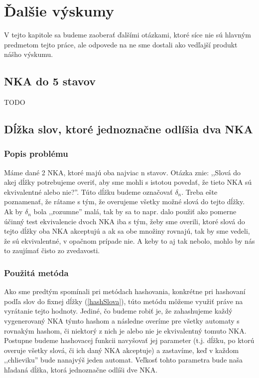 \chapter{Ďalšie výskumy}

V tejto kapitole sa budeme zaoberať ďalšími otázkami, ktoré síce nie sú hlavným predmetom tejto práce, ale odpovede na ne sme dostali ako vedľajší produkt nášho výskumu.

\section{NKA do 5 stavov}

TODO

\section{Dĺžka slov, ktoré jednoznačne odlíšia dva NKA}


\subsection{Popis problému}
Máme dané 2 NKA, ktoré majú oba najviac n stavov. Otázka znie: ,,Slová do akej dĺžky potrebujeme overiť, aby sme mohli s istotou povedať, že tieto NKA sú ekvivalentné alebo nie?''. Túto dĺžku budeme označovať $\delta_n$. Treba ešte poznamenať, že rátame s tým, že overujeme všetky možné slová do tejto dĺžky.  Ak by $\delta_n$ bola ,,rozumne'' malá, tak by sa to napr. dalo použiť ako pomerne účinný test ekvivalencie dvoch NKA iba s tým, žeby sme overili, ktoré slová do tejto dĺžky oba NKA akceptujú a ak sa obe množiny rovnajú, tak by sme vedeli, že sú ekvivalentné, v opačnom prípade nie. A keby to aj tak nebolo, mohlo by nás to zaujímať čisto zo zvedavosti. 

\subsection{Použitá metóda}
Ako sme predtým spomínali pri metódach hashovania, konkrétne pri hashovaní podľa slov do fixnej dĺžky (\ref{hashSlova}), túto metódu môžeme využiť práve na vyrátanie tejto hodnoty. Jediné, čo budeme robiť je, že zahashujeme každý vygenerovaný NKA týmto hashom a následne overíme pre všetky automaty s rovnakým hashom, či niektorý z nich je alebo nie je ekvivalentný tomuto NKA. Postupne budeme hashovacej funkcii navyšovať jej parameter (t.j. dĺžku, po ktorú overuje všetky slová, či ich daný NKA akceptuje) a zastavíme, keď v každom ,,chlieviku'' bude nanajvýš jeden automat. Veľkosť tohto parametra bude naša hľadaná dĺžka, ktorá jednoznačne odlíši dve NKA.

